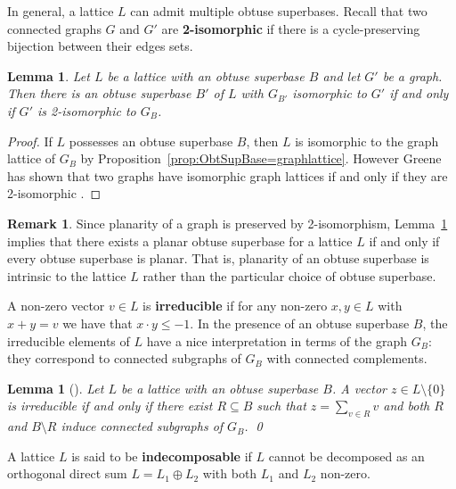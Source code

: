 \documentclass{amsart} %
\theoremstyle{thm}
\newtheorem{lem}[Theorem]{Lemma}
\theoremstyle{definition}
\newtheorem{rem}[Theorem]{Remark}
\numberwithin{equation}{section}
\begin{document}
In general, a lattice $L$ can admit multiple obtuse superbases. Recall that two connected graphs $G$ and $G'$ are \textbf{2-isomorphic} if there is a cycle-preserving bijection between their edges sets. 
\begin{lem}\label{lem:2-iso}
Let $L$ be a lattice with an obtuse superbase $B$ and let $G'$ be a graph. Then there is an obtuse superbase $B'$ of $L$ with $G_{B'}$ isomorphic to $G'$ if and only if $G'$ is 2-isomorphic to $G_B$.
\end{lem}
\begin{proof}
If $L$ possesses an obtuse superbase $B$, then $L$ is isomorphic to the graph lattice of $G_B$ by Proposition~\ref{prop:ObtSupBase=graphlattice}. However Greene has shown that two graphs have isomorphic graph lattices if and only if they are 2-isomorphic \cite[Theorem~3.8]{Gr13}.
\end{proof}

\begin{rem}
    Since planarity of a graph is preserved by 2-isomorphism, Lemma~\ref{lem:2-iso} implies that there exists a planar obtuse superbase for a lattice $L$ if and only if every obtuse superbase is planar. That is, planarity of an obtuse superbase is intrinsic to the lattice $L$ rather than the particular choice of obtuse superbase.
\end{rem}

A non-zero vector $v\in L$ is \textbf{irreducible} if for any non-zero $x,y \in L$ with $x+y=v$ we have that $x\cdot y \leq -1$. In the presence of an obtuse superbase $B$, the irreducible elements of $L$ have a nice interpretation in terms of the graph $G_B$: they correspond to connected subgraphs of $G_B$ with connected complements.

\begin{lem}[{\cite[Lemma~2.2]{McCoyAltUnknotting}}]\label{lem:irreducible}
Let $L$ be a lattice with an obtuse superbase $B$. A vector $z \in L\setminus \{0\}$ is irreducible if and only if there exist $R\subseteq B$ such that $z=\sum_{v\in R} v$ and both $R$ and $B\setminus R$ induce connected subgraphs of $G_B$. \qed
\end{lem}

A lattice $L$ is said to be \textbf{indecomposable} if $L$ cannot be decomposed as an orthogonal direct sum $L=L_1 \oplus L_2$ with both $L_1$ and $L_2$ non-zero. 
\end{document}
